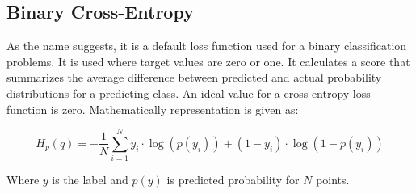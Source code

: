 \documentclass[11pt]{article}
\begin{document}
\subsection{Binary Cross-Entropy}
As the name suggests, it is a default loss function used for a binary classification problems. It is used where target values are zero or one. It calculates a score that summarizes the average difference between predicted and actual probability distributions for a predicting class. An ideal value for a cross entropy loss function is zero. Mathematically representation is given as:

\begin{equation}
H_{p}(q)=-\frac{1}{N} \sum_{i=1}^{N} y_{i} \cdot \log \left(p\left(y_{i}\right)\right)+\left(1-y_{i}\right) \cdot \log \left(1-p\left(y_{i}\right)\right)
\label{bce}
\end{equation}

Where $y$ is the label and $p(y)$ is predicted probability for $N$ points.
\end{document}

